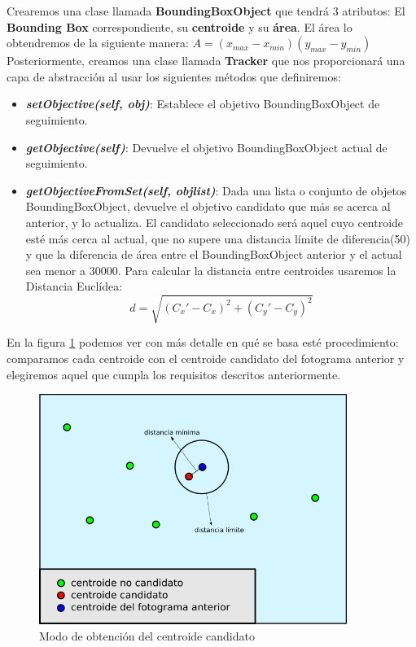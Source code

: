 Crearemos una clase llamada \textbf{BoundingBoxObject} que tendrá 3 atributos: El \textbf{Bounding Box} correspondiente, su \textbf{centroide} y su \textbf{área}. El área lo obtendremos de la siguiente manera: $A = (x_{max} - x_{min}) (y_{max} - y_{min})$\\

Posteriormente, creamos una clase llamada \textbf{Tracker} que nos proporcionará una capa de abstracción al usar los siguientes métodos que definiremos:
\begin{itemize}
	\item \textbf{\textit{setObjective(self, obj)}}: Establece el objetivo BoundingBoxObject de seguimiento.
	\item \textbf{\textit{getObjective(self)}}: Devuelve el objetivo BoundingBoxObject actual de seguimiento.
	\item \textbf{\textit{getObjectiveFromSet(self, objlist)}}: Dada una lista o conjunto de objetos BoundingBoxObject, devuelve el objetivo candidato que más se acerca al anterior, y lo actualiza. El candidato seleccionado será aquel cuyo centroide esté más cerca al actual, que no supere una distancia límite de diferencia(50) y que la diferencia de área entre el BoundingBoxObject anterior y el actual sea menor a 30000. Para calcular la distancia entre centroides usaremos la Distancia Euclídea:
	\begin{equation*}
	d = \sqrt{(C_{x}' - C_{x})^2 + (C_{y}' - C_{y})^2}
	\end{equation*}
\end{itemize}

En la figura \ref{fig:obtencion_centroide} podemos ver con más detalle en qué se basa esté procedimiento: comparamos cada centroide con el centroide candidato del fotograma anterior y elegiremos aquel que cumpla los requisitos descritos anteriormente.
\begin{figure} [H]
  \begin{center}
    \includegraphics[width=10cm]{imagenes/esquema-tracker.png}
  \end{center}
  \caption[Modo de obtención del centroide candidato]{Modo de obtención del centroide candidato}
  \label{fig:obtencion_centroide}
\end{figure}

